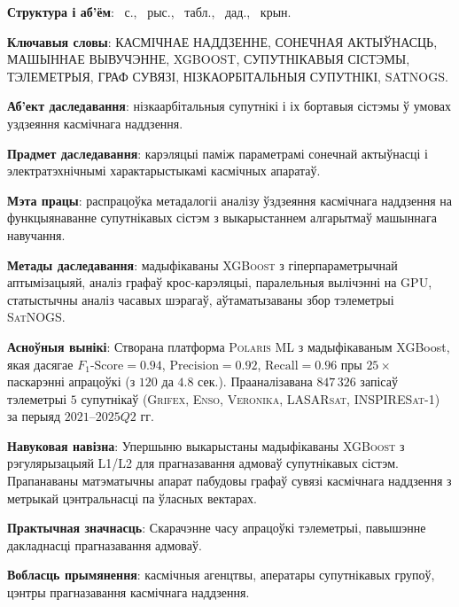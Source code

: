 \textbf{Структура і аб’ём}: \maincontentpages~с., \totalfigures~рыс.,
\totaltables~табл., ~дад., \thetotalsources~крын.

\textbf{Ключавыя словы}: КАСМІЧНАЕ НАДДЗЕННЕ, СОНЕЧНАЯ АКТЫЎНАСЦЬ, МАШЫННАЕ ВЫВУЧЭННЕ, XGBOOST, СУПУТНІКАВЫЯ СІСТЭМЫ, ТЭЛЕМЕТРЫЯ, ГРАФ СУВЯЗІ, НІЗКАОРБІТАЛЬНЫЯ СУПУТНІКІ, SATNOGS.

\textbf{Аб’ект даследавання}: нізкаарбітальныя супутнікі і іх бортавыя сістэмы ў умовах уздзеяння касмічнага наддзення.

\textbf{Прадмет даследавання}: карэляцыі паміж параметрамі сонечнай актыўнасці і электратэхнічнымі характарыстыкамі касмічных апаратаў.

\textbf{Мэта працы}: распрацоўка метадалогіі аналізу ўздзеяння касмічнага наддзення на функцыянаванне супутнікавых сістэм з выкарыстаннем алгарытмаў машыннага навучання.

\textbf{Метады даследавання}: мадыфікаваны \textsc{XGBoost} з гіперпараметрычнай аптымізацыяй, аналіз графаў крос-карэляцыі, паралельныя вылічэнні на \textsc{GPU}, статыстычны аналіз часавых шэрагаў, аўтаматызаваны збор тэлеметрыі \textsc{SatNOGS}.

\textbf{Асноўныя вынікі}: Створана платформа \textsc{Polaris ML} з мадыфікаваным XGBoost, якая дасягае $F_1\text{-Score} = 0.94$,
$\text{Precision} = 0.92$, $\text{Recall} = 0.96$ пры $25{\times}$ паскарэнні апрацоўкі (з $120$ да $4.8$ сек.). Прааналізавана $847{\,}326$ запісаў тэлеметрыі $5$ супутнікаў (\textsc{Grifex}, \textsc{Enso}, \textsc{Veronika}, \textsc{LASARsat}, \textsc{INSPIRESat-1}) за перыяд $2021$--$2025Q2$ гг.

\textbf{Навуковая навізна}: Упершыню выкарыстаны мадыфікаваны \textsc{XGBoost} з рэгулярызацыяй L1/L2 для прагназавання адмоваў супутнікавых сістэм. Прапанаваны матэматычны апарат пабудовы графаў сувязі касмічнага наддзення з метрыкай цэнтральнасці па ўласных вектарах.

\textbf{Практычная значнасць}: Скарачэнне часу апрацоўкі тэлеметрыі, павышэнне дакладнасці прагназавання адмоваў.

\textbf{Вобласць прымянення}: касмічныя агенцтвы, аператары супутнікавых групоў, цэнтры прагназавання касмічнага наддзення.
